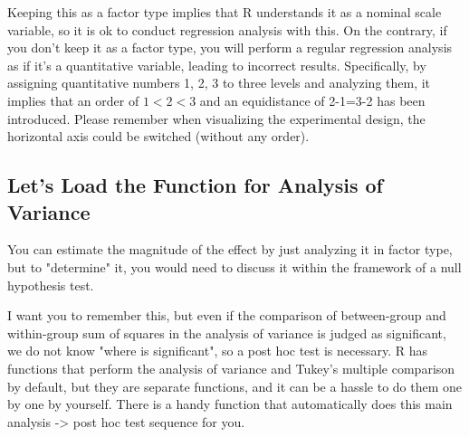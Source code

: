 \documentclass{ltjbook}
\begin{document}
Keeping this as a factor type implies that R understands it as a nominal scale variable, so it is ok to conduct regression analysis with this. On the contrary, if you don't keep it as a factor type, you will perform a regular regression analysis as if it's a quantitative variable, leading to incorrect results. Specifically, by assigning quantitative numbers 1, 2, 3 to three levels and analyzing them, it implies that an order of $1<2<3$ and an equidistance of 2-1=3-2 has been introduced. Please remember when visualizing the experimental design, the horizontal axis could be switched (without any order).

\subsection{Let's Load the Function for Analysis of Variance}
You can estimate the magnitude of the effect by just analyzing it in factor type, but to "determine" it, you would need to discuss it within the framework of a null hypothesis test.

I want you to remember this, but even if the comparison of between-group and within-group sum of squares in the analysis of variance is judged as significant, we do not know "where is significant", so a post hoc test is necessary. R has functions that perform the analysis of variance and Tukey's multiple comparison by default, but they are separate functions, and it can be a hassle to do them one by one by yourself. There is a handy function that automatically does this main analysis -> post hoc test sequence for you.
\end{document}
